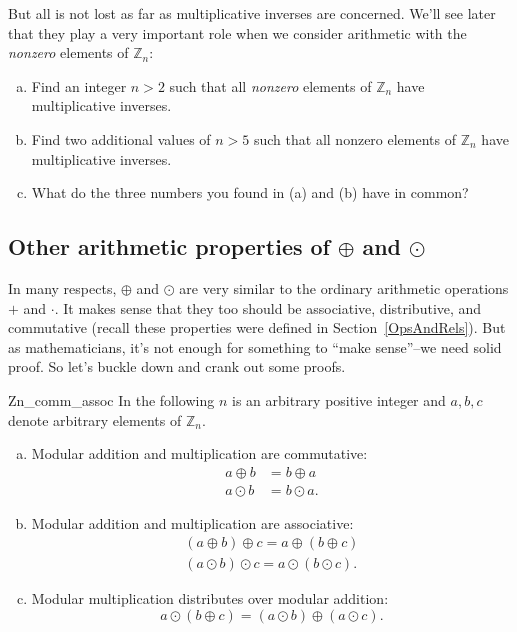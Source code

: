 But all is not lost as far as multiplicative inverses are concerned. We'll see later that they play a very important role when we consider arithmetic with the \emph{nonzero} elements of ${\mathbb Z}_n$:

\begin{exercise}{60}
\begin{enumerate}[(a)]
\item
Find an integer $n>2$ such that all \emph{nonzero} elements of ${\mathbb Z}_n$ have multiplicative inverses.
\item
Find two additional values of $n>5$ such that all nonzero elements of ${\mathbb Z}_n$ have multiplicative inverses.
\item
What do the three numbers you found in (a) and (b) have in common?
\end{enumerate}
\end{exercise}

\subsection{Other arithmetic properties of $\oplus$ and $\odot$}

In many respects, $\oplus$ and $\odot$ are very similar to the ordinary arithmetic operations $+$ and $\cdot$. It makes sense that they too should be associative, distributive, and commutative  (recall these properties were defined   in Section~\ref{OpsAndRels}). But as mathematicians, it's not enough for something to ``make sense''--we need solid proof. So let's buckle down and crank out some proofs.

\begin{prop}{Zn_comm_assoc}
In the following $n$ is an arbitrary positive integer and $a, b, c$ denote arbitrary elements of ${\mathbb Z}_n$.
\begin{enumerate}[(a)]
 
\item \label{comm}  %
Modular addition and multiplication are commutative:  
\begin{align*}
a \oplus b  & =  b \oplus a  \\
a \odot b   & =  b \odot a .
\end{align*}
 
\item \label{assoc}  %
Modular addition and multiplication are associative: 
\begin{align*}
(a \oplus b) \oplus c  =  a \oplus (b \oplus c) \\
(a \odot b) \odot c    =  a \odot (b \odot c).
\end{align*}
 
\item \label{distrib}  %
Modular multiplication distributes over modular addition: 
\[
a \odot (b \oplus c)  = (a \odot b)\oplus (a \odot c).
\]
\end{enumerate}
\end{prop}

